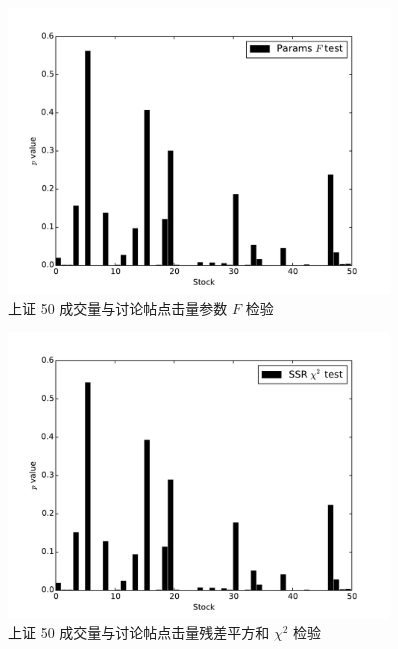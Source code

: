 \begin{figure}
  \centering
  \includegraphics[width=0.9\textwidth]{plots/granger_causality_test_on_sse_50_params_ftest.pdf}
  \caption{上证 50 成交量与讨论帖点击量参数 $F$ 检验}
  \label{f_test:13}
\end{figure}

\begin{figure}
  \centering
  \includegraphics[width=0.9\textwidth]{plots/granger_causality_test_on_sse_50_ssr_chi2test.pdf}
  \caption{上证 50 成交量与讨论帖点击量残差平方和 $\chi^{2}$ 检验}
  \label{f_test:14}
\end{figure}

